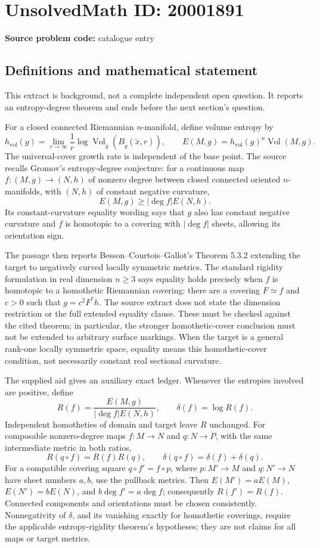 \documentclass[11pt]{article}
\begin{document}
\section*{UnsolvedMath ID: 20001891}
\textbf{Source problem code:} catalogue entry
\subsection{Definitions and mathematical statement}
This extract is background, not a complete independent open question. It reports an entropy-degree theorem and ends before the next section's question.

For a closed connected Riemannian \(n\)-manifold, define volume entropy by
\[
h_{\mathrm{vol}}(g)=\lim_{r\to\infty}\frac1r
\log\operatorname{Vol}_{\widetilde g}(B_{\widetilde g}(\widetilde x,r)),\qquad
E(M,g)=h_{\mathrm{vol}}(g)^n\operatorname{Vol}(M,g).
\]
The universal-cover growth rate is independent of the base point. The source recalls Gromov's entropy-degree conjecture: for a continuous map \(f:(M,g)\to(N,h)\) of nonzero degree between closed connected oriented \(n\)-manifolds, with \((N,h)\) of constant negative curvature,
\[
E(M,g)\geq|\deg f|E(N,h).
\]
Its constant-curvature equality wording says that \(g\) also has constant negative curvature and \(f\) is homotopic to a covering with \(|\deg f|\) sheets, allowing its orientation sign.

The passage then reports Besson--Courtois--Gallot's Theorem 5.3.2 extending the target to negatively curved locally symmetric metrics. The standard rigidity formulation in real dimension \(n\geq3\) says equality holds precisely when \(f\) is homotopic to a homothetic Riemannian covering: there are a covering \(F\simeq f\) and \(c>0\) such that \(g=c^2F^*h\). The source extract does not state the dimension restriction or the full extended equality clause. These must be checked against the cited theorem; in particular, the stronger homothetic-cover conclusion must not be extended to arbitrary surface markings. When the target is a general rank-one locally symmetric space, equality means this homothetic-cover condition, not necessarily constant real sectional curvature.

The supplied aid gives an auxiliary exact ledger. Whenever the entropies involved are positive, define
\[
R(f)=\frac{E(M,g)}{|\deg f|E(N,h)},\qquad\delta(f)=\log R(f).
\]
Independent homotheties of domain and target leave \(R\) unchanged. For composable nonzero-degree maps \(f:M\to N\) and \(q:N\to P\), with the same intermediate metric in both ratios,
\[
R(q\circ f)=R(f)R(q),\qquad\delta(q\circ f)=\delta(f)+\delta(q).
\]
For a compatible covering square \(q\circ f'=f\circ p\), where \(p:M'\to M\) and \(q:N'\to N\) have sheet numbers \(a,b\), use the pullback metrics. Then \(E(M')=aE(M)\), \(E(N')=bE(N)\), and \(b\deg f'=a\deg f\); consequently \(R(f')=R(f)\). Connected components and orientations must be chosen consistently. Nonnegativity of \(\delta\), and its vanishing exactly for homothetic coverings, require the applicable entropy-rigidity theorem's hypotheses; they are not claims for all maps or target metrics.
\end{document}
